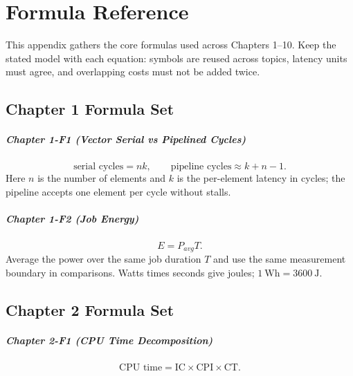 \chapter{Formula Reference}\label{ch:formula-compendium}
This appendix gathers the core formulas used across Chapters 1--10.
Keep the stated model with each equation: symbols are reused across topics, latency units must agree, and overlapping costs must not be added twice.


\begingroup
\setlength{\abovedisplayskip}{0.35\baselineskip}
\setlength{\belowdisplayskip}{0.45\baselineskip}
\setlength{\abovedisplayshortskip}{0.35\baselineskip}
\setlength{\belowdisplayshortskip}{0.45\baselineskip}

\section*{Chapter 1 Formula Set}\label{sec:auto-056}

\paragraph{Chapter 1-F1 (Vector Serial vs Pipelined Cycles)}\label{par:auto-043}
\begin{equation}\label{eq:auto-054}
    \text{serial cycles}=nk,\qquad
    \text{pipeline cycles}\approx k+n-1.
\end{equation}
Here $n$ is the number of elements and $k$ is the per-element latency in cycles; the pipeline accepts one element per cycle without stalls.

\paragraph{Chapter 1-F2 (Job Energy)}\label{par:formula-job-energy}
\begin{equation}\label{eq:reference-job-energy}
    E=P_{avg}T.
\end{equation}
Average the power over the same job duration $T$ and use the same measurement boundary in comparisons. Watts times seconds give joules; $1\ \mathrm{Wh}=3600\ \mathrm{J}$.


\section*{Chapter 2 Formula Set}\label{sec:auto-057}

\paragraph{Chapter 2-F1 (CPU Time Decomposition)}\label{par:auto-044}
\begin{equation}\label{eq:auto-055}
    \text{CPU time}=\text{IC}\times\text{CPI}\times\text{CT}.
\end{equation}

